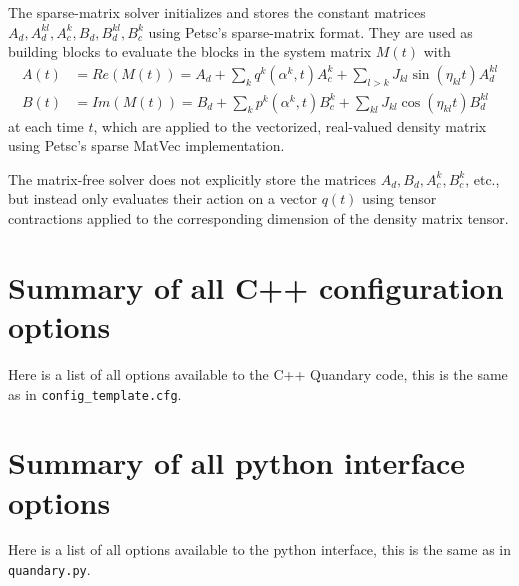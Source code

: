 \documentclass[11pt]{article}
\begin{document}
  
  The sparse-matrix solver initializes and stores the constant matrices
       $A_d, A_d^{kl}, A_c^k, B_d, B_d^{kl}, B_c^k$ using Petsc's sparse-matrix format. They are used
       as building blocks to evaluate the blocks in the system matrix $M(t)$ with 
     \begin{align}
       A(t) &= Re(M(t)) = A_d + \sum_k q^k(\alpha^k, t)A_c^k + \sum_{l>k} J_{kl} \sin(\eta_{kl}t) A_d^{kl}\\
       B(t) &= Im(M(t)) = B_d + \sum_k p^k(\alpha^k, t)B_c^k + \sum_{kl} J_{kl} \cos(\eta_{kl}t) B_d^{kl}
     \end{align}
   at each time $t$, which are applied to the vectorized, real-valued density matrix using Petsc's sparse MatVec implementation. 

  The matrix-free solver does not explicitly store the matrices $A_d,B_d,
       A_c^k, B_c^k$, etc., but instead only evaluates their action on a vector $q(t)$ using tensor contractions applied to the corresponding dimension of the density matrix tensor. 
  



  \section{Summary of all C++ configuration options}
  Here is a list of all options available to the C++ Quandary code, this is the same as in \texttt{config\_template.cfg}.
 
  


  \section{Summary of all python interface options}
  Here is a list of all options available to the python interface, this is the same as in \texttt{quandary.py}.

  
  
\end{document}
